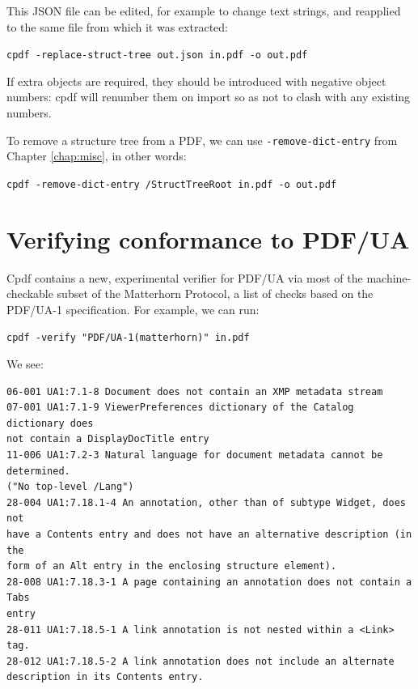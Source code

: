 \documentclass{book}
\begin{document}
This JSON file can be edited, for example to change text strings, and reapplied to the same file from which it was extracted:

  \begin{framed}
    \noindent\small\verb!cpdf -replace-struct-tree out.json in.pdf -o out.pdf!
  \end{framed}

\noindent If extra objects are required, they should be introduced with negative object numbers: cpdf will renumber them on import so as not to clash with any existing numbers.

To remove a structure tree from a PDF, we can use \texttt{-remove-dict-entry} from Chapter \ref{chap:misc}, in other words:

  \begin{framed}
    \noindent\small\verb!cpdf -remove-dict-entry /StructTreeRoot in.pdf -o out.pdf!
  \end{framed}

\section{Verifying conformance to PDF/UA}

Cpdf contains a new, experimental verifier for PDF/UA via most of the machine-checkable subset of the Matterhorn Protocol, a list of checks based on the PDF/UA-1 specification. For example, we can run:

  \begin{framed}
    \noindent\small\verb!cpdf -verify "PDF/UA-1(matterhorn)" in.pdf!
  \end{framed}

\noindent We see:

{\small\begin{verbatim}
06-001 UA1:7.1-8 Document does not contain an XMP metadata stream 
07-001 UA1:7.1-9 ViewerPreferences dictionary of the Catalog dictionary does
not contain a DisplayDocTitle entry 
11-006 UA1:7.2-3 Natural language for document metadata cannot be determined.
("No top-level /Lang")
28-004 UA1:7.18.1-4 An annotation, other than of subtype Widget, does not
have a Contents entry and does not have an alternative description (in the
form of an Alt entry in the enclosing structure element). 
28-008 UA1:7.18.3-1 A page containing an annotation does not contain a Tabs
entry 
28-011 UA1:7.18.5-1 A link annotation is not nested within a <Link> tag. 
28-012 UA1:7.18.5-2 A link annotation does not include an alternate
description in its Contents entry. 
\end{verbatim}}
\end{document}
